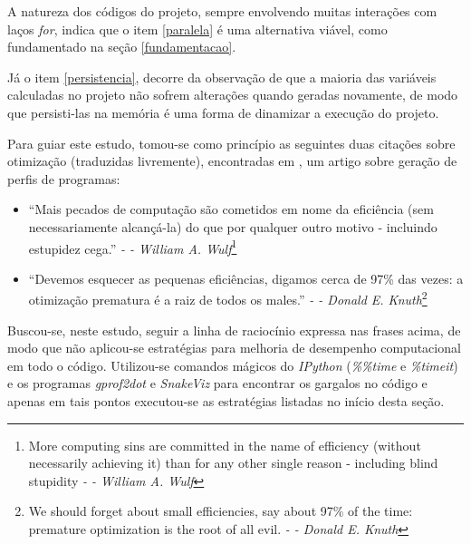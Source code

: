 \documentclass[12pt]{article}
\newcommand{\aspas}[1]{``#1''} %
\begin{document}
A natureza dos códigos do projeto, sempre envolvendo muitas interações com laços \textit{for}, indica que o item \ref{paralela} é uma alternativa viável, como fundamentado na seção \ref{fundamentacao}.

Já o item \ref{persistencia}, decorre da observação de que a maioria das variáveis calculadas no projeto não sofrem alterações quando geradas novamente, de modo que persisti-las na memória é uma forma de dinamizar a execução do projeto.

Para guiar este estudo, tomou-se como princípio as seguintes duas citações sobre otimização (traduzidas livremente), encontradas em \cite{hegde:2004}, um artigo sobre geração de perfis de programas:

\begin{itemize}
	\item \aspas{Mais pecados de computação são cometidos em nome da eficiência (sem necessariamente alcançá-la) do que por qualquer outro motivo - incluindo estupidez cega.} \textit{- -  William A. Wulf}\footnote{More computing sins are committed in the name of efficiency (without necessarily achieving it) than for any other single reason - including blind stupidity \textit{- -  William A. Wulf}}
	\item \aspas{Devemos esquecer as pequenas eficiências, digamos cerca de 97\% das vezes: a otimização prematura é a raiz de todos os males.} \textit{- -  Donald E. Knuth}\footnote{We should forget about small efficiencies, say about 97\% of the time: premature optimization is the root of all evil. \textit{- -  Donald E. Knuth}}
\end{itemize}

Buscou-se, neste estudo, seguir a linha de raciocínio expressa nas frases acima, de modo que não aplicou-se estratégias para melhoria de desempenho computacional em todo o código. Utilizou-se comandos mágicos do \textit{IPython} (\textit{\%\%time} e \textit{\%timeit}) e os programas \textit{gprof2dot} e \textit{SnakeViz} para encontrar os gargalos no código e apenas em tais pontos executou-se as estratégias listadas no início desta seção.


\end{document}
